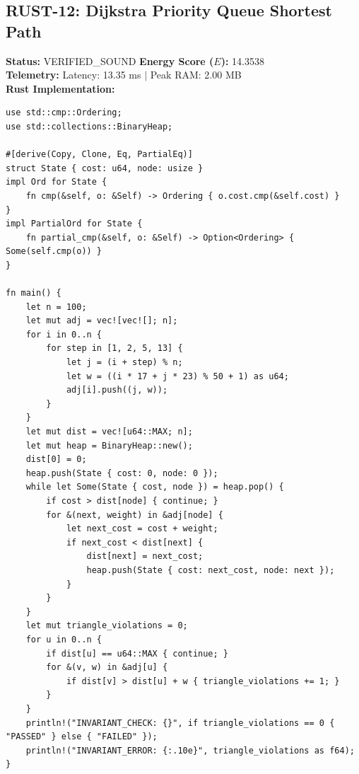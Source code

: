 \documentclass[11pt, a4paper]{article}
\begin{document}
\subsection{RUST-12: Dijkstra Priority Queue Shortest Path}
\textbf{Status:} VERIFIED\_SOUND \hfill \textbf{Energy Score ($E$):} 14.3538\\
\textbf{Telemetry:} Latency: 13.35 ms $|$ Peak RAM: 2.00 MB\\
\textbf{Rust Implementation:}
\begin{verbatim}
use std::cmp::Ordering;
use std::collections::BinaryHeap;

#[derive(Copy, Clone, Eq, PartialEq)]
struct State { cost: u64, node: usize }
impl Ord for State {
    fn cmp(&self, o: &Self) -> Ordering { o.cost.cmp(&self.cost) }
}
impl PartialOrd for State {
    fn partial_cmp(&self, o: &Self) -> Option<Ordering> { Some(self.cmp(o)) }
}

fn main() {
    let n = 100;
    let mut adj = vec![vec![]; n];
    for i in 0..n {
        for step in [1, 2, 5, 13] {
            let j = (i + step) % n;
            let w = ((i * 17 + j * 23) % 50 + 1) as u64;
            adj[i].push((j, w));
        }
    }
    let mut dist = vec![u64::MAX; n];
    let mut heap = BinaryHeap::new();
    dist[0] = 0;
    heap.push(State { cost: 0, node: 0 });
    while let Some(State { cost, node }) = heap.pop() {
        if cost > dist[node] { continue; }
        for &(next, weight) in &adj[node] {
            let next_cost = cost + weight;
            if next_cost < dist[next] {
                dist[next] = next_cost;
                heap.push(State { cost: next_cost, node: next });
            }
        }
    }
    let mut triangle_violations = 0;
    for u in 0..n {
        if dist[u] == u64::MAX { continue; }
        for &(v, w) in &adj[u] {
            if dist[v] > dist[u] + w { triangle_violations += 1; }
        }
    }
    println!("INVARIANT_CHECK: {}", if triangle_violations == 0 { "PASSED" } else { "FAILED" });
    println!("INVARIANT_ERROR: {:.10e}", triangle_violations as f64);
}
\end{verbatim}
\end{document}
